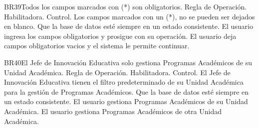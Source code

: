 \begin{BussinesRule}{BR39}{Todos los campos marcados con (*) son obligatorios.}
    \BRitem[Tipo:] Regla de Operación.
    \BRitem[Clase:] Habilitadora.
    \BRitem[Nivel:] Control.
    \BRitem[Descripción:] Los campos marcados con un (*), no se pueden ser dejados en blanco.
    \BRitem[Sentencia:]
    \BRitem[Motivación: ]Que la base de datos esté siempre en un estado consistente.
     El usuario ingresa los campos obligatorios y prosigue con su operación.
    El usuario deja campos obligatorios vacios y el sistema le permite continuar.
\end{BussinesRule}
\begin{BussinesRule}{BR40}{El Jefe de Innovación Educativa solo gestiona Programas Académicos de su Unidad Académica.}
    \BRitem[Tipo:] Regla de Operación.
    \BRitem[Clase:] Habilitadora.
    \BRitem[Nivel:] Control.
    \BRitem[Descripción:] El Jefe de Innovación Educativa tienen el filtro predeterminado de su Unidad Académica para la gestión de Programas Académicos.
    \BRitem[Sentencia:]
    \BRitem[Motivación: ]Que la base de datos esté siempre en un estado consistente.
     El usuario gestiona Programas Académicos de su Unidad Académica.
    El usuario gestiona Programas Académicos de otra Unidad Académica.
\end{BussinesRule}
